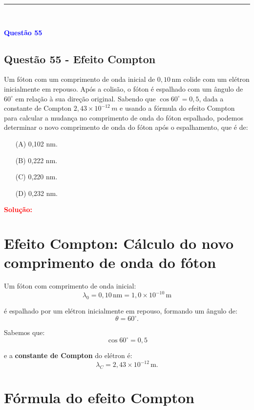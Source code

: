 \noindent\rule{\linewidth}{0.6pt}\\

\begin{flushleft}
\textbf{\textcolor{blue}{\Large Quest\~ao 55}}\\
\noindent
\subsection{Quest\~ao 55 - Efeito Compton}
Um fóton com um comprimento de onda inicial de \(0,10\,\text{nm}\) colide com um elétron inicialmente em repouso.  
Após a colisão, o fóton é espalhado com um ângulo de \(60^\circ\) em relação à sua direção original.  
Sabendo que \(\cos 60^\circ = 0,5\), dada a constante de Compton \(2,43 \times 10^{-12}\,m\) e usando a fórmula do 
efeito Compton para calcular a mudança no comprimento de onda do fóton espalhado, podemos determinar o novo comprimento 
de onda do fóton após o espalhamento, que é de:


\begin{itemize}
\item[(A)] 0{,}102 nm.
\item[(B)] 0{,}222 nm.
\item[(C)] 0{,}220 nm.
\item[(D)] 0{,}232 nm.
\end{itemize}

\vspace{0.5cm}

\textcolor{red}{\textbf{Solução:}}\\

\section*{Efeito Compton: Cálculo do novo comprimento de onda do fóton}

Um fóton com comprimento de onda inicial:
\[
\lambda_0 = 0{,}10\,\mathrm{nm} = 1{,}0 \times 10^{-10}\,\mathrm{m}
\]

é espalhado por um elétron inicialmente em repouso, formando um ângulo de:
\[
\theta = 60^\circ.
\]

Sabemos que:
\[
\cos 60^\circ = 0{,}5
\]

e a \textbf{constante de Compton} do elétron é:
\[
\lambda_C = 2{,}43 \times 10^{-12}\,\mathrm{m}.
\]

\section*{Fórmula do efeito Compton}


\end{flushleft}
